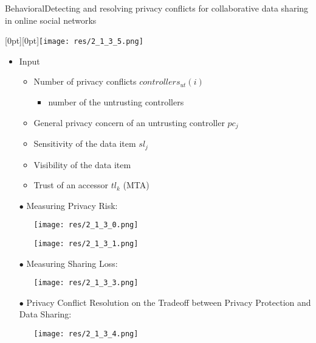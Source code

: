 \begin{frame}{Behavioral}{Detecting and resolving privacy conflicts for collaborative data sharing in online social networks \cite{hu_detecting_2011}}


	\hfill
	\raisebox{-\height}[0pt][0pt]{\texttt{[image: res/2\_1\_3\_5.png]}}

	\begin{itemize}

		\item Input

			\begin{itemize}

				\item Number of privacy conflicts $ controllers_{ut} (i)$
					\begin{itemize}
						\item number of the untrusting controllers 
					\end{itemize}
			
				\item General privacy concern of an untrusting controller $pc_{j}$
				\item Sensitivity of the data item $sl_{j}$
				\item Visibility of the data item
				\item Trust of an accessor $tl_{k}$ (MTA)

			\end{itemize}
	
		\item[$\bullet$]  Measuring Privacy Risk:
	
			\begin{itemize}
				\item[]	\texttt{[image: res/2\_1\_3\_0.png]}
				\item[]	\texttt{[image: res/2\_1\_3\_1.png]}
			\end{itemize}
	
	
		\item[$\bullet$]	Measuring Sharing Loss:

			\begin{itemize}
				\item[]	\texttt{[image: res/2\_1\_3\_3.png]}
			\end{itemize}

		\item[$\bullet$]	Privacy Conflict Resolution on the Tradeoff between Privacy Protection and Data Sharing:

			\begin{itemize}
				\item[]	\texttt{[image: res/2\_1\_3\_4.png]}
			\end{itemize}
	

	\end{itemize}
	
\end{frame}

